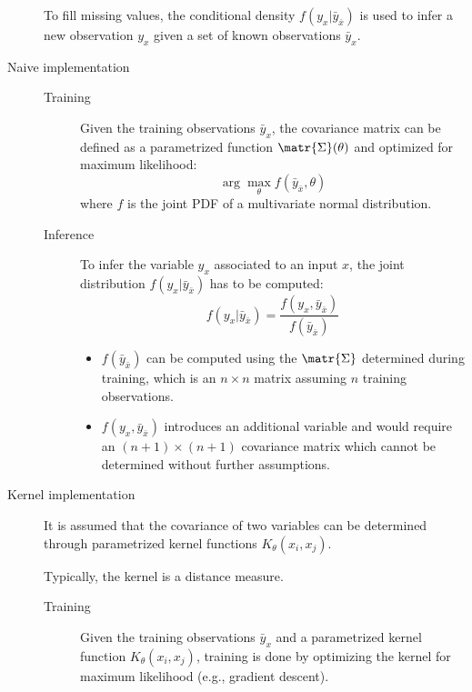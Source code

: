 \begin{description}
        \begin{remark}
            To fill missing values, the conditional density $f(y_x | \bar{y}_{\bar{x}})$ is used to infer a new observation $y_x$ given a set of known observations $\bar{y}_x$.
        \end{remark}


    \item[Naive implementation] \phantom{}
        \begin{description}
            \item[Training] 
                Given the training observations $\bar{y}_x$, the covariance matrix can be defined as a parametrized function $\matr{\Sigma}(\theta)$ and optimized for maximum likelihood:
                \[ \arg\max_{\theta} f(\bar{y}_{\bar{x}}, \theta) \]
                where $f$ is the joint PDF of a multivariate normal distribution.

            \item[Inference] 
                To infer the variable $y_x$ associated to an input $x$, the joint distribution $f(y_x | \bar{y}_{\bar{x}})$ has to be computed:
                \[ f(y_x | \bar{y}_{\bar{x}}) = \frac{f(y_x, \bar{y}_{\bar{x}})}{f(\bar{y}_{\bar{x}})} \]
                \begin{itemize}
                    \item $f(\bar{y}_{\bar{x}})$ can be computed using the $\matr{\Sigma}$ determined during training, which is an $n \times n$ matrix assuming $n$ training observations.
                    \item $f(y_x, \bar{y}_{\bar{x}})$ introduces an additional variable and would require an $(n+1) \times (n+1)$ covariance matrix which cannot be determined without further assumptions.
                \end{itemize}
        \end{description}

    \item[Kernel implementation]
        It is assumed that the covariance of two variables can be determined through parametrized kernel functions $K_\theta(x_i, x_j)$.

        \begin{remark}
            Typically, the kernel is a distance measure.
        \end{remark}

        \begin{description}
            \item[Training]
                Given the training observations $\bar{y}_x$ and a parametrized kernel function $K_\theta(x_i, x_j)$, training is done by optimizing the kernel for maximum likelihood (e.g., gradient descent).


\end{description}
\end{description}
